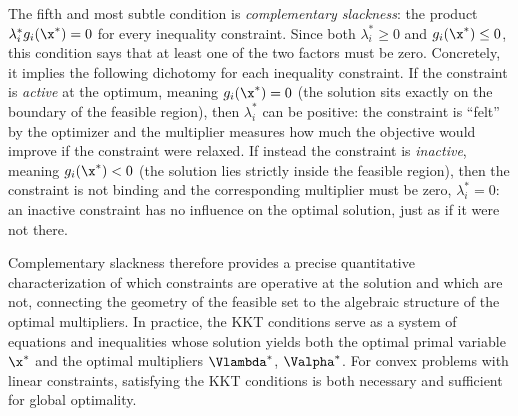The fifth and most subtle condition is \emph{complementary slackness}: the product $\lambda_i^* g_i(\x^*) = 0$ for every inequality constraint. Since both $\lambda_i^* \geq 0$ and $g_i(\x^*) \leq 0$, this condition says that at least one of the two factors must be zero. Concretely, it implies the following dichotomy for each inequality constraint. If the constraint is \emph{active} at the optimum, meaning $g_i(\x^*)=0$ (the solution sits exactly on the boundary of the feasible region), then $\lambda_i^*$ can be positive: the constraint is ``felt'' by the optimizer and the multiplier measures how much the objective would improve if the constraint were relaxed. If instead the constraint is \emph{inactive}, meaning $g_i(\x^*)<0$ (the solution lies strictly inside the feasible region), then the constraint is not binding and the corresponding multiplier must be zero, $\lambda_i^*=0$: an inactive constraint has no influence on the optimal solution, just as if it were not there.

Complementary slackness therefore provides a precise quantitative characterization of which constraints are operative at the solution and which are not, connecting the geometry of the feasible set to the algebraic structure of the optimal multipliers. In practice, the KKT conditions serve as a system of equations and inequalities whose solution yields both the optimal primal variable $\x^*$ and the optimal multipliers $\Vlambda^*$, $\Valpha^*$. For convex problems with linear constraints, satisfying the KKT conditions is both necessary and sufficient for global optimality.
